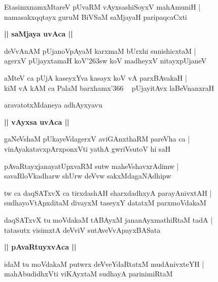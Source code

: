 \documentclass[twoside,12pt,openright]{book}
\def\S{\char'263}
\newcounter{shloka}[chapter]
\def\uvaca#1{\centerline{{\large\textbf{#1}}}}
\begin{document}
\begin{shloka}%
EtasimxnamxMtareV pUvaRM vAyxsashiSoyxV mahAmuniH |\\
namasakxqqtayx guruM BiVSaM saMjayaH paripaqcaCxti 
\end{shloka}

\uvaca{|| saMjaya uvAca ||}

\begin{shloka}%
deVvAnAM pUjanoVpAyaM karxmaM bUrxhi sunishicxtaM |\\
agerxV pUjayxtamaH koV\S sw koV madheyxV nitayxpUjaneV 
\end{shloka}

\begin{shloka}%
aMteV ca pUjA kaseyxYva kasayx koV vA parxBAvakaH |\\
kiM vA kAM ca PalaM barxhamx\char'366 ~ pUjayitAvx laBeVnanxraH 
\end{shloka}

\begin{center}
aravatotxMdaneya adhAyxyavu
\end{center}

\uvaca{|| vAyxsa uvAca ||}

\begin{shloka}%
gaNeVshaM pUkayeVdagerxV aviGAnxthaRM pareVha ca |\\
vinAyakatavxpArxponxVti yathA gwriVsutoV hi saH 
\end{shloka}

\begin{shloka}%
pAvaRtayxjanayatUpxvaRM sutw maheVshavxrAdimw |\\
savaRloVkadharw shUrw deVvw sakxMdagaNAdhipw 
\end{shloka}

\begin{shloka}%
tw ca daqSATxvX ca tirxdashAH sharxdadhxyA parayAnivxtAH |\\
sudhayoVtApxditaM divayxM taseyxY datatxM parxmoVdakaM 
\end{shloka}

\begin{shloka}%
daqSATxvX tu moVdakaM tABAyxM jananAyxmathiRtaM tadA |\\
tatasutx visimxtA deVviV sutAveVvApayxBASata 
\end{shloka}

\uvaca{|| pAvaRtuyxvAca ||}

\begin{shloka}%
idaM tu moVdakaM putwrx deVveYdaRtatxM mudAnivxteYH |\\
mahAbudidhxVti viKAyxtaM sudhayA parinimiRtaM 
\end{shloka}
\end{document}
